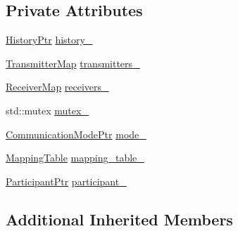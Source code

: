 \subsection*{Private Attributes}
\begin{DoxyCompactItemize}
\item 
\hyperlink{classapollo_1_1cyber_1_1transport_1_1HybridTransmitter_aee5ef32dcbaab6fcd68459e5f5afd6d8}{History\-Ptr} \hyperlink{classapollo_1_1cyber_1_1transport_1_1HybridTransmitter_a1017c9487fef9eabf20b6b6b29eda7a1}{history\-\_\-}
\item 
\hyperlink{classapollo_1_1cyber_1_1transport_1_1HybridTransmitter_a79fe84264b152838a2a921ca7c428d31}{Transmitter\-Map} \hyperlink{classapollo_1_1cyber_1_1transport_1_1HybridTransmitter_af892972e289032b86439449acb60fffe}{transmitters\-\_\-}
\item 
\hyperlink{classapollo_1_1cyber_1_1transport_1_1HybridTransmitter_a57d8d230cedd2328577b9789ab964a5c}{Receiver\-Map} \hyperlink{classapollo_1_1cyber_1_1transport_1_1HybridTransmitter_aa6ef011a6f48194c1472ed77694df9e2}{receivers\-\_\-}
\item 
std\-::mutex \hyperlink{classapollo_1_1cyber_1_1transport_1_1HybridTransmitter_a176663880b7f2fad09dfca0bbadd00bf}{mutex\-\_\-}
\item 
\hyperlink{classapollo_1_1cyber_1_1transport_1_1HybridTransmitter_aebca8e1bc93bfde3563c0c8b8c92bfa9}{Communication\-Mode\-Ptr} \hyperlink{classapollo_1_1cyber_1_1transport_1_1HybridTransmitter_a81a8c87167bf743445c97e903e3bffd1}{mode\-\_\-}
\item 
\hyperlink{classapollo_1_1cyber_1_1transport_1_1HybridTransmitter_a7073fcd5fe2232785a883a3f494d00ed}{Mapping\-Table} \hyperlink{classapollo_1_1cyber_1_1transport_1_1HybridTransmitter_a8002d94e9c7b130cc68cc7721e96a5e7}{mapping\-\_\-table\-\_\-}
\item 
\hyperlink{namespaceapollo_1_1cyber_1_1transport_a4214d0780331276d0384d0b57e3bc688}{Participant\-Ptr} \hyperlink{classapollo_1_1cyber_1_1transport_1_1HybridTransmitter_a7edc04c43198a2ff400e7ef9d41c5e18}{participant\-\_\-}
\end{DoxyCompactItemize}
\subsection*{Additional Inherited Members}


